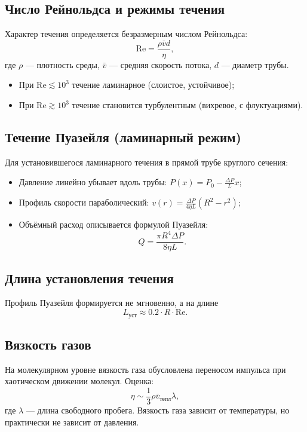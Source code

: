 \documentclass[12pt,a4paper]{article}
\begin{document}
\subsection{Число Рейнольдса и режимы течения}
Характер течения определяется безразмерным числом Рейнольдса:
\begin{equation}
    \mathrm{Re} = \frac{\rho \bar{v} d}{\eta},
\end{equation}
где $\rho$ — плотность среды, $\bar{v}$ — средняя скорость потока, $d$ — диаметр трубы.
\begin{itemize}
    \item При $\mathrm{Re} \lesssim 10^3$ течение ламинарное (слоистое, устойчивое);
    \item При $\mathrm{Re} \gtrsim 10^3$ течение становится турбулентным (вихревое, с флуктуациями).
\end{itemize}

\subsection{Течение Пуазейля (ламинарный режим)}
Для установившегося ламинарного течения в прямой трубе круглого сечения:
\begin{itemize}
    \item Давление линейно убывает вдоль трубы: $P(x) = P_0 - \frac{\Delta P}{L} x$;
    \item Профиль скорости параболический: $v(r) = \frac{\Delta P}{4\eta L}(R^2 - r^2)$;
    \item Объёмный расход описывается формулой Пуазейля:
    \begin{equation}
        Q = \frac{\pi R^4 \Delta P}{8 \eta L}.
    \end{equation}
\end{itemize}

\subsection{Длина установления течения}
Профиль Пуазейля формируется не мгновенно, а на длине
\begin{equation}
    L_{\text{уст}} \approx 0.2 \cdot R \cdot \mathrm{Re}.
\end{equation}

\subsection{Вязкость газов}
На молекулярном уровне вязкость газа обусловлена переносом импульса при хаотическом движении молекул. Оценка:
\begin{equation}
    \eta \sim \frac{1}{3} \rho \bar{v}_{\text{тепл}} \lambda,
\end{equation}
где $\lambda$ — длина свободного пробега. Вязкость газа зависит от температуры, но практически не зависит от давления.
\end{document}
